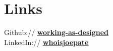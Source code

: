 \documentclass[letterpaper]{deedy-resume} %
\begin{document}
\begin{minipage}[t]{0.33\textwidth}

\section{Links}

Github:// \href{https://github.com/working-as-designed}{\bf working-as-designed} \\
LinkedIn:// \href{https://linkedin.com/in/whoisjoepate/}{\bf whoisjoepate} \\

\sectionspace %


\end{minipage} %
\hfill
%
%
\end{document}
